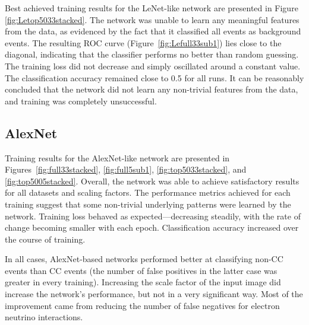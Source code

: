 \documentclass{pracalicmgr}
\begin{document}
    


Best achieved training results for the LeNet-like network are presented in Figure \ref{fig:Letop5033stacked}. The network was unable to learn any meaningful features from the data, as evidenced by the fact that it classified all events as background events. The resulting ROC curve (Figure~\ref{fig:Lefull33sub1}) lies close to the diagonal, indicating that the classifier performs no better than random guessing. The training loss did not decrease and simply oscillated around a constant value. The classification accuracy remained close to 0.5 for all runs. It can be reasonably concluded that the network did not learn any non-trivial features from the data, and training was completely unsuccessful.

\subsection{AlexNet}

Training results for the AlexNet-like network are presented in Figures~\ref{fig:full33stacked}, \ref{fig:full5sub1}, \ref{fig:top5033stacked}, and \ref{fig:top5005stacked}. Overall, the network was able to achieve satisfactory results for all datasets and scaling factors. The performance metrics achieved for each training suggest that some non-trivial underlying patterns were learned by the network. Training loss behaved as expected—decreasing steadily, with the rate of change becoming smaller with each epoch. Classification accuracy increased over the course of training.

In all cases, AlexNet-based networks performed better at classifying non-CC events than CC events (the number of false positives in the latter case was greater in every training). Increasing the scale factor of the input image did increase the network's performance, but not in a very significant way. Most of the improvement came from reducing the number of false negatives for electron neutrino interactions.
\end{document}
